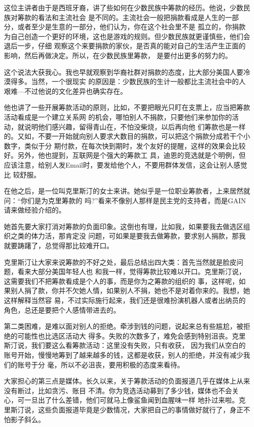 ﻿\documentclass[11pt]{article}
\begin{document}
这位主讲者由于是西班牙裔，讲了些如何在少数民族中筹款的经历。他说，少数民族对筹款的看法和主流社会
是不同的。主流社会一般把捐款看成是人生的一部分，或者至少是生意的一部分，他们认为，你在这个社会里不是
孤立的，你捐款为自己创造一个更好的环境，这也是游戏的规则。但少数民族就更谨慎些，他们会退后一步，仔细
观察这个来要捐款的家伙，是否真的能对自己的生活产生正面的影响，然后再做决定。所以，在少数民族里筹款，
是要付出更多的努力的。

这个说法大获我心。我也早就观察到华裔社群对捐款的态度，比大部分美国人要冷漠得多。当然，一个很现实
的原因是：少数民族的生计一般都比主流社会中的人艰难---不过他说的文化差异也确实存在。

他也讲了一些开展筹款活动的原则，比如，不要把眼光只盯在支票上，应当把筹款活动看成是一个建立关系网
的机会，哪怕别人不捐款，只要他们来参加你的活动，就说明他们感兴趣，留得青山在，不怕没柴烧，以后再向他
们筹款也是一样的。又如，不要一开始就向别人要求大数目的捐款，可以把这个捐款分成若干个小数字，类似于分
期付款，在每次快到期时，发个友好的提醒，这样的效果会比较好。另外，他也提到，互联网是个强大的筹款工
具，迪恩的竞选就是个明例，但应该注意，给别人发Email时，要发给他个人，不要用群体发信，这会让别人感觉比
较舒服。

在他之后，是一位叫克里斯汀的女士来讲。她似乎是一位职业筹款者，上来居然就问：``你们是为克里筹款的
吗?''看来不像别人那样是民主党的支持者，而是GAIN请来做经验介绍的。

她首先要大家打消对筹款的负面印象。这倒也有理，比如我，如果要我去做选区组织之类的体力活，那肯定没
问题，可如果是要我去做筹款，要求别人捐款，那我就要踌躇了，总觉得那比较难开口。

克里斯汀让大家来说筹款的不好之处，最后总结出四大类：首先当然就是脸皮问题，看来大部分美国年轻人也
和我一样，觉得筹款比较难以开口。克里斯汀说，这需要我们不把筹款看成是个人的事，而是你为之筹款的组织的
事，这样呢，如果别人捐了款，你并不欠她人情，如果别人不捐，她也不是对着你来的。我想，她这样解释当然容
易，不过实际施行起来，我们还是很难扮演机器人或者出纳员的角色，总还是要把个人感情带进去的。

第二类困难，是难以面对别人的拒绝。牵涉到钱的问题，说起来总有些尴尬，被拒绝的可能性也比选区活动大
得多。失败的次数多了，难免会感到特别沮丧。克里斯汀说，我们要这么看筹款活动：这里没有失败，只有收获，
因为我们从空白的账号开始，慢慢地筹到了越来越多的钱，这都是收获，别人的拒绝，并没有减少我们的账号于分
毫，所以不必沮丧，要用积极的态度来看待。

大家担心的第三点是媒体。长久以来，关于筹款活动的负面报道几乎在媒体上从来没有断过，比如贪污、账目
不清。你为竞选活动募到了多少钱，媒体也不会关心，可一旦出了什么差错，他们可就马上像鲨鱼闻到血腥味一样
地扑过来啦。克里斯汀说，这些负面报道毕竟是少数情况，大家把自己的事情做好就行了，身正不怕影子斜么。
\end{document}
